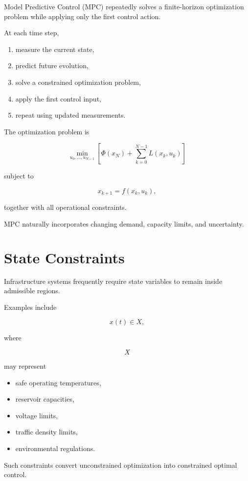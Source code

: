 \documentclass[11pt,fleqn]{book}
\numberwithin{equation}{chapter}
\theoremstyle{plain}
\theoremstyle{definition}
\theoremstyle{remark}
\begin{document}
Model Predictive Control (MPC) repeatedly solves a finite-horizon
optimization problem while applying only the first control action.

At each time step,

\begin{enumerate}
\item measure the current state,
\item predict future evolution,
\item solve a constrained optimization problem,
\item apply the first control input,
\item repeat using updated measurements.
\end{enumerate}

The optimization problem is

\[
\boxed{
\min_{u_0,\ldots,u_{N-1}}
\left[
\Phi(x_N)
+
\sum_{k=0}^{N-1}
L(x_k,u_k)
\right]
}
\]

subject to

\[
x_{k+1}=f(x_k,u_k),
\]

together with all operational constraints.

MPC naturally incorporates changing demand,
capacity limits,
and uncertainty.


\section{State Constraints}

Infrastructure systems frequently require state variables to remain
inside admissible regions.

Examples include

\[
x(t)\in X,
\]

where

\[
X
\]

may represent

\begin{itemize}
\item safe operating temperatures,
\item reservoir capacities,
\item voltage limits,
\item traffic density limits,
\item environmental regulations.
\end{itemize}

Such constraints convert unconstrained optimization into constrained
optimal control.
\end{document}
